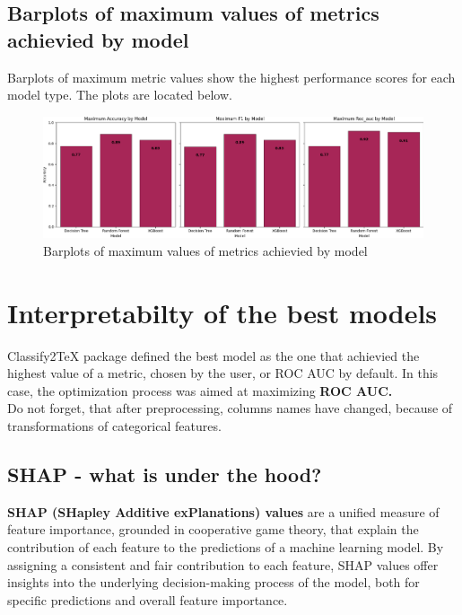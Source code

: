 \documentclass{article}%
\begin{document}
%
\subsection{Barplots of maximum values of metrics achievied by model}%
\label{subsec:Barplotsofmaximumvaluesofmetricsachieviedbymodel}%
Barplots of maximum metric values show the highest performance scores for each model type. The plots are located below.%


\begin{figure}[h!]%
\centering%
\includegraphics[width=460px]{ModelOptimization/barplots_max_metric.png}%
\caption{Barplots of maximum values of metrics achievied by model}%
\end{figure}

%
\newpage%
\section{Interpretabilty of the best models}%
\label{sec:Interpretabiltyofthebestmodels}%
Classify2TeX package defined the best model as the one that achievied the highest value of a metric, chosen by the user, or ROC AUC by default.%
In this case, the optimization process was aimed at maximizing%
\textbf{ ROC AUC.}%
\\%
Do not forget, that after preprocessing, columns names have changed, because of transformations of categorical features.%
\subsection{SHAP {-} what is under the hood?}%
\label{subsec:SHAP{-}whatisunderthehood?}%

        \textbf{SHAP (SHapley Additive exPlanations) values} are a unified measure of feature importance, grounded in cooperative game theory, that explain the contribution of each feature to the predictions of a machine learning model. By assigning a consistent and fair contribution to each feature, SHAP values offer insights into the underlying decision-making process of the model, both for specific predictions and overall feature importance.
\end{document}
